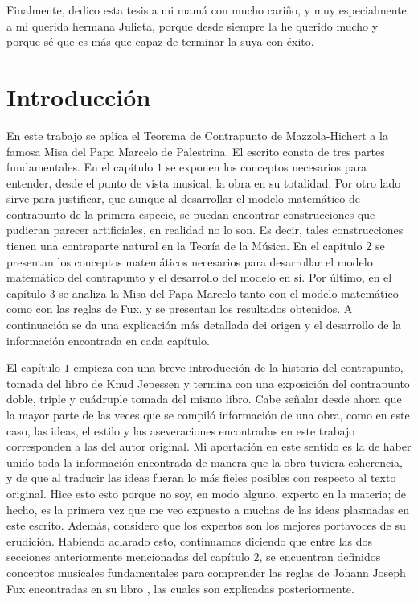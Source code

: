 \documentclass[letterpaper,12pt]{book}
\theoremstyle{definition} \newtheorem{Def}{Definición}[chapter]
\theoremstyle{definition} \newtheorem{Teo}{Teorema}[chapter]
\theoremstyle{definition} \newtheorem{Pro}{Proposición}[chapter]
\theoremstyle{definition} \newtheorem{Lema}{Lema}[chapter]
\begin{document}
Finalmente, dedico esta tesis a mi mamá con mucho cariño, y muy especialmente a mi querida hermana Julieta, porque desde siempre la he querido mucho y porque sé que es más que capaz de terminar la suya con éxito.

\chapter{Introducción}

En este trabajo se aplica el Teorema de Contrapunto de Mazzola-Hichert a la famosa Misa del Papa Marcelo de Palestrina. El escrito consta de tres partes fundamentales. En el capítulo $1$ se exponen los conceptos necesarios para entender, desde el punto de vista musical, la obra en su totalidad. Por otro lado sirve para justificar, que aunque al desarrollar el modelo matemático de contrapunto de la primera especie, se puedan encontrar construcciones que pudieran parecer artificiales, en realidad no lo son. Es decir, tales construcciones tienen una contraparte natural en la Teoría de la Música. En el capítulo $2$ se presentan los conceptos matemáticos necesarios para desarrollar el modelo matemático del contrapunto y el desarrollo del modelo en sí. Por último, en el capítulo $3$ se analiza la Misa del Papa Marcelo tanto con el modelo matemático como con las reglas de Fux, y se presentan los resultados obtenidos. A continuación se da una explicación más detallada dei origen y el desarrollo de la información encontrada en cada capítulo.

El capítulo $1$ empieza con una breve introducción de la historia del contrapunto, tomada del libro de Knud Jepessen \cite{Counterpoint} y termina con una exposición del contrapunto doble, triple y cuádruple tomada del mismo libro. Cabe señalar desde ahora que la mayor parte de las veces que se compiló información de una obra, como en este caso, las ideas, el estilo y las aseveraciones encontradas en este trabajo corresponden a las del autor original. Mi aportación en este sentido es la de haber unido toda la información encontrada de manera que la obra tuviera coherencia, y de que al traducir las ideas fueran lo más fieles posibles con respecto al texto original. Hice esto esto porque no soy, en modo alguno, experto en la materia; de hecho, es la primera vez que me veo expuesto a muchas de las ideas plasmadas en este escrito. Además, considero que los expertos son los mejores portavoces de su erudición. Habiendo aclarado esto, continuamos diciendo que entre las dos secciones anteriormente mencionadas del capítulo $2$, se encuentran definidos conceptos musicales fundamentales para comprender las reglas de Johann Joseph Fux encontradas en su libro \cite{Gradus}, las cuales son explicadas posteriormente.
\end{document}

